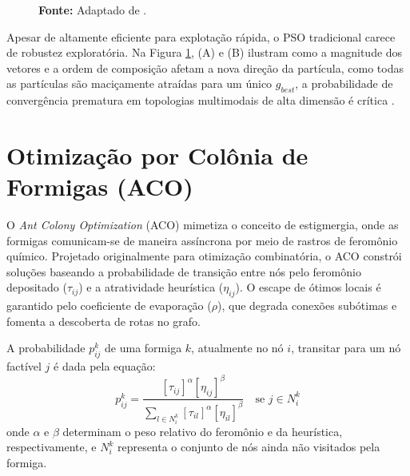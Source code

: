\documentclass[12pt, a4paper, oneside]{report}
\begin{document}
\begin{figure}[htbp]
  \par\vspace{0.2cm}
  \centerline{\small \textbf{Fonte:} Adaptado de \citet{devika2023}.}
  \label{fig:pso_passo_a_passo_imagem}
\end{figure}

Apesar de altamente eficiente para explotação rápida, o PSO tradicional carece de robustez exploratória. Na Figura \ref{fig:pso_passo_a_passo_imagem}, (A) e (B) ilustram como a magnitude dos vetores e a ordem de composição afetam a nova direção da partícula, como todas as partículas são maciçamente atraídas para um único $g_{best}$, a probabilidade de convergência prematura em topologias multimodais de alta dimensão é crítica \citep{huang2023evaluation}.

\newpage

\section{Otimização por Colônia de Formigas (ACO)}

O \textit{Ant Colony Optimization} (ACO) \citep{dorigo2004ant} mimetiza o conceito de estigmergia, onde as formigas comunicam-se de maneira assíncrona por meio de rastros de feromônio químico. Projetado originalmente para otimização combinatória, o ACO constrói soluções baseando a probabilidade de transição entre nós pelo feromônio depositado ($\tau_{ij}$) e a atratividade heurística ($\eta_{ij}$). O escape de ótimos locais é garantido pelo coeficiente de evaporação ($\rho$), que degrada conexões subótimas e fomenta a descoberta de rotas no grafo.

A probabilidade $p_{ij}^k$ de uma formiga $k$, atualmente no nó $i$, transitar para um nó factível $j$ é dada pela equação:
\begin{equation}
    p_{ij}^k = \frac{[\tau_{ij}]^\alpha [\eta_{ij}]^\beta}{\sum_{l \in N_i^k} [\tau_{il}]^\alpha [\eta_{il}]^\beta} \quad \text{se } j \in N_i^k
    \label{eq:aco_prob}
\end{equation}
onde $\alpha$ e $\beta$ determinam o peso relativo do feromônio e da heurística, respectivamente, e $N_i^k$ representa o conjunto de nós ainda não visitados pela formiga.
\end{document}
